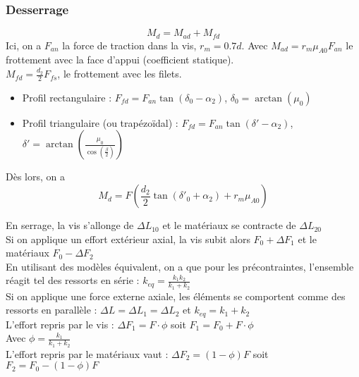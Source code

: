 \documentclass[../main.tex]{subfiles}
\begin{document}
\subsubsection{Desserrage}
\begin{equation}
    M_d = M_{ad}+M_{fd}
\end{equation}
Ici, on a $F_{an}$ la force de traction dans la vis, $r_m = 0.7d$. 
Avec $M_{ad} = r_m \mu_{A0} F_{an}$ le frottement avec la face d'appui (coefficient statique).\\
$M_{fd} = \frac{d_2}{2}F_{fs}$, le frottement avec les filets. \begin{itemize}
    \item Profil rectangulaire : $F_{fd} = F_{an} \tan(\delta_0-\alpha_2)$, $\delta_0 = \arctan(\mu_0)$\\
    \item Profil triangulaire (ou trapézoïdal) : $F_{fd} = F_{an} \tan(\delta'-\alpha_2)$, $\delta' = \arctan(\frac{\mu_0}{\cos(\frac{\beta}{2})})$\\
\end{itemize}
Dès lors, on a \\
\begin{equation}
    M_d = F(\frac{d_2}{2} \tan(\delta'_0 + \alpha_2) + r_m \mu_{A0})
\end{equation}

En serrage, la vis s'allonge de $\Delta L_{10}$ et le matériaux se contracte de $\Delta L_{20}$\\

Si on applique un effort extérieur axial, la vis subit alors $F_0+\Delta F_1$ et le matériaux $F_0-\Delta F_2$\\

En utilisant des modèles équivalent, on a que pour les précontraintes, l'ensemble réagit tel des ressorts en série : $k_{eq} = \frac{k_1k_2}{k_1+k_2}$\\
Si on applique une force externe axiale, les éléments se comportent comme des ressorts en parallèle : $\Delta L = \Delta L_1 = \Delta L_2$ et $k_{eq} = k_1+k_2$\\

L'effort repris par le vis : $\Delta F_1 = F \cdot \phi$ soit $F_1 = F_0 + F\cdot \phi$\\
Avec $\phi = \frac{k_1}{k_1+k_2}$\\

L'effort repris par le matériaux vaut : $\Delta F_2 = (1-\phi)F$ soit $F_2 = F_0-(1-\phi)F$\\
\end{document}
